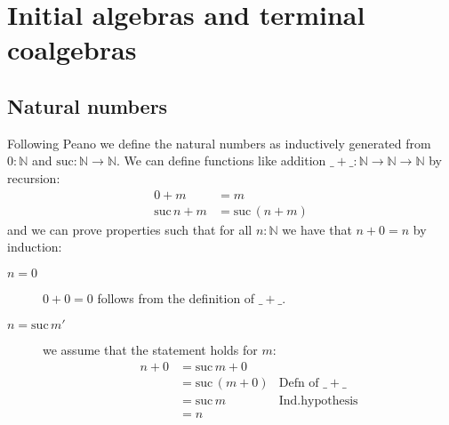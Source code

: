 \documentclass{article}
\newcommand{\Nat}{\mathbb{N}}
\newcommand{\suc}{\mathrm{suc}}
\begin{document}
\section{Initial algebras and terminal coalgebras}
\label{sec:init-algebr-term}

\subsection{Natural numbers}
\label{sec:natural-numbers}

Following Peano we define the natural numbers as inductively generated from $0:\Nat$ and $\suc : \Nat \to \Nat$. We can define functions like addition
$\_+\_ : \Nat \to \Nat \to \Nat$ by recursion:
\begin{align*}
  0 + m & = m\\
  \suc\,n + m & = \suc\,(n + m)
\end{align*}
and we can prove properties such that for all $n : \Nat$ we have that $n + 0 = n$ by induction:
\begin{description}
\item[$n=0$] $0 + 0 = 0$ follows from the definition of $\_+\_$.
\item[$n = \suc\,m'$] we assume that the statement holds for $m$:
  \begin{align*}
    n + 0 
    & = \suc\,m + 0 \\
    & = \suc\,(m + 0) & \mbox{Defn of $\_+\_$}\\
    & = \suc\,m & \mbox{Ind.hypothesis} \\
    & = n
  \end{align*}
\end{description}
\end{document}
